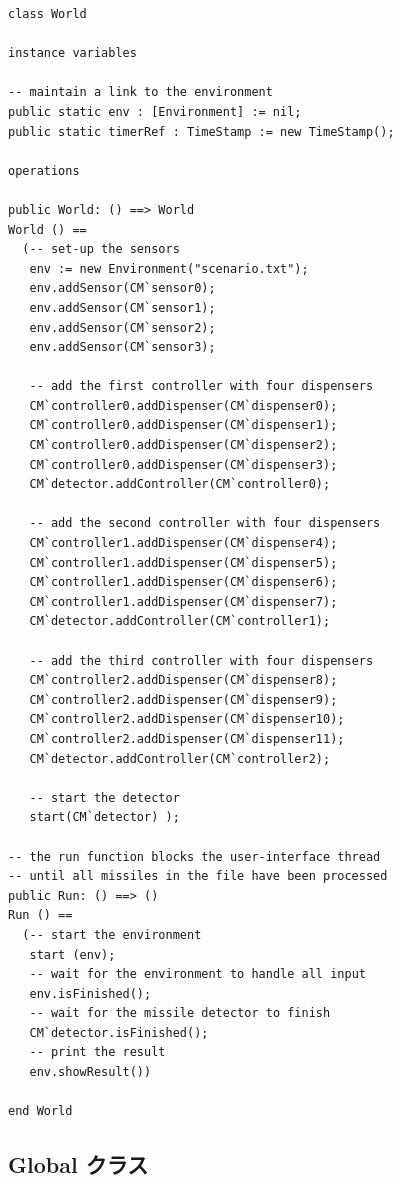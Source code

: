\documentclass[\pformat,12pt]{jreport}
\begin{document}
\begin{lstlisting}
class World

instance variables

-- maintain a link to the environment
public static env : [Environment] := nil;
public static timerRef : TimeStamp := new TimeStamp();

operations

public World: () ==> World
World () ==
  (-- set-up the sensors
   env := new Environment("scenario.txt");
   env.addSensor(CM`sensor0);
   env.addSensor(CM`sensor1);
   env.addSensor(CM`sensor2);
   env.addSensor(CM`sensor3);

   -- add the first controller with four dispensers
   CM`controller0.addDispenser(CM`dispenser0);
   CM`controller0.addDispenser(CM`dispenser1);
   CM`controller0.addDispenser(CM`dispenser2);
   CM`controller0.addDispenser(CM`dispenser3);
   CM`detector.addController(CM`controller0);

   -- add the second controller with four dispensers
   CM`controller1.addDispenser(CM`dispenser4);
   CM`controller1.addDispenser(CM`dispenser5);
   CM`controller1.addDispenser(CM`dispenser6);
   CM`controller1.addDispenser(CM`dispenser7);
   CM`detector.addController(CM`controller1);
 
   -- add the third controller with four dispensers
   CM`controller2.addDispenser(CM`dispenser8);
   CM`controller2.addDispenser(CM`dispenser9);
   CM`controller2.addDispenser(CM`dispenser10);
   CM`controller2.addDispenser(CM`dispenser11);
   CM`detector.addController(CM`controller2);
      
   -- start the detector
   start(CM`detector) );

-- the run function blocks the user-interface thread
-- until all missiles in the file have been processed
public Run: () ==> ()
Run () == 
  (-- start the environment
   start (env);
   -- wait for the environment to handle all input
   env.isFinished();
   -- wait for the missile detector to finish
   CM`detector.isFinished();
   -- print the result
   env.showResult())

end World
\end{lstlisting}

\subsection{Global クラス}
\end{document}
